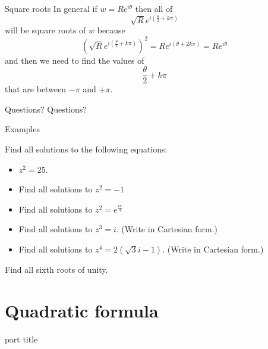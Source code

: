 \documentclass{beamer}
\begin{document}
\begin{frame}{Square roots}
In general if $w = Re^{i\theta}$ then all of
\begin{equation*}
\sqrt{R}e^{i\left(\frac{\theta}{2}+k\pi\right)}
\end{equation*}
will be square roots of $w$ because
\begin{equation*}
\left(\sqrt{R}e^{i\left(\frac{\theta}{2}+k\pi\right)}\right)^2 = Re^{i\left(\theta+2k\pi\right)} = Re^{i\theta}
\end{equation*}
and then we need to find the values of 
\begin{equation*}
\frac{\theta}{2}+k\pi
\end{equation*}
that are between $-\pi$ and $+\pi$.
\end{frame}

\begin{frame}{Questions?}
Questions?
\end{frame}

\begin{frame}{Examples}
\begin{example}
Find all solutions to the following equations:
\begin{itemize}
	\item $z^2 = 25$. %
	\item Find all solutions to $z^2 = -1$ %
	\item Find all solutions to $z^2 = e^{\frac{i\pi}{4}}$ %
	\item Find all solutions to $z^3 = i$. (Write in Cartesian form.) %
	\item Find all solutions to $z^4 = 2(\sqrt{3}i-1)$. (Write in Cartesian form.) %
\end{itemize}
\end{example}
\begin{example}
Find all sixth roots of unity.
\end{example}
\end{frame}

\section{Quadratic formula}

\begin{frame}
\begin{beamercolorbox}[sep=12pt,center]{part title}
\insertsection\par
\end{beamercolorbox}
\end{frame}
\end{document}
